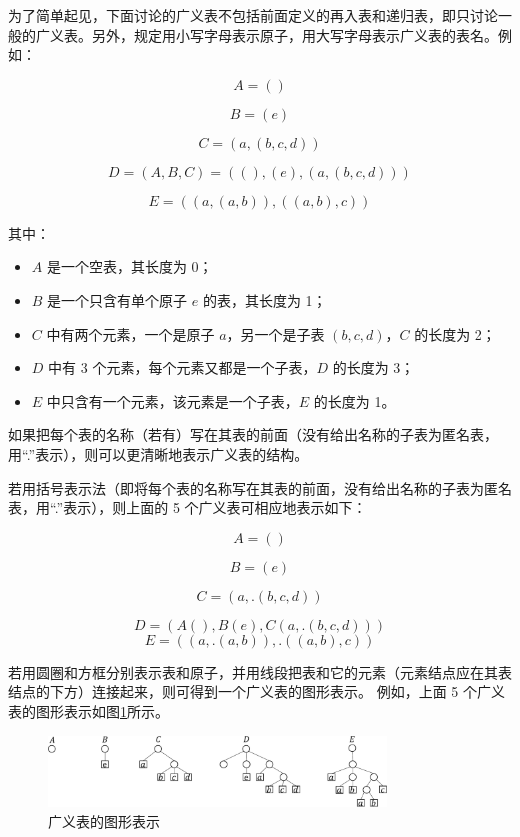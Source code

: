 \documentclass[lang=cn,newtx,10pt,scheme=chinese]{../elegantbook}
\begin{document}
为了简单起见，下面讨论的广义表不包括前面定义的再入表和递归表，即只讨论一般的广义表。另外，规定用小写字母表示原子，用大写字母表示广义表的表名。例如：

\[
A = ()
\]

\[
 B = (e)
\]

\[
C = (a, (b, c, d))
\]

\[
D = (A, B, C) = ((), (e), (a, (b, c, d)))
\]

\[
E = ((a, (a, b)), ((a, b), c))
\]

其中：
\begin{itemize}
  \item $A$ 是一个空表，其长度为 0；
  \item $B$ 是一个只含有单个原子 $e$ 的表，其长度为 1；
  \item $C$ 中有两个元素，一个是原子 $a$，另一个是子表 $(b, c, d)$，$C$ 的长度为 2；
  \item $D$ 中有 3 个元素，每个元素又都是一个子表，$D$ 的长度为 3；
  \item $E$ 中只含有一个元素，该元素是一个子表，$E$ 的长度为 1。
\end{itemize}

如果把每个表的名称（若有）写在其表的前面（没有给出名称的子表为匿名表，用“.”表示），则可以更清晰地表示广义表的结构。

若用括号表示法（即将每个表的名称写在其表的前面，没有给出名称的子表为匿名表，用“.”表示），则上面的 5 个广义表可相应地表示如下：

\[
A = ()
\]

\[
  B = (e)
\]

\[
  C = (a, .(b, c, d))
\]

\[
D = (A(), B(e), C(a, .(b, c, d)))
\]
\[
E = ((a, .(a, b)), .((a, b), c))
\]

若用圆圈和方框分别表示表和原子，并用线段把表和它的元素（元素结点应在其表结点的下方）连接起来，则可得到一个广义表的图形表示。
例如，上面 5 个广义表的图形表示如图\ref{fig:generalized_table}所示。

\begin{figure}[!htbp]
  \centering
  \includegraphics[width=0.8\textwidth]{./figure/pdf/cropped/GLGraph.pdf}
  \caption{广义表的图形表示}
  \label{fig:generalized_table}
\end{figure}
\end{document}

